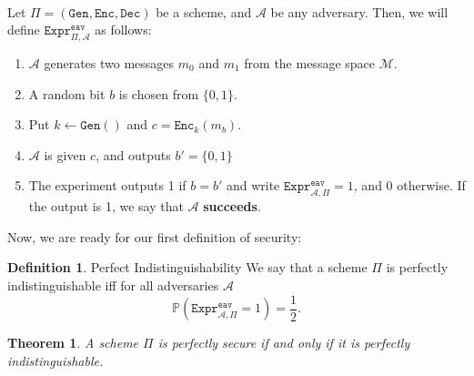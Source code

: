\documentclass{article}
\newtheorem{theorem}{Theorem}[section]
\theoremstyle{definition}
\newtheorem{definition}{Definition}[section]
\newcommand{\Enc}{\texttt{Enc}}
\newcommand{\Dec}{\texttt{Dec}}
\newcommand{\Gen}{\texttt{Gen}}
\newcommand{\M}{\mathcal{M}}
\newcommand{\A}{\mathcal{A}}
\newcommand{\Prob}{\mathbb{P}}
\newcommand{\Expr}[2]{\texttt{Expr}^{\texttt{#1}}_{#2}}
\begin{document}
\paragraph{}
Let $\Pi = (\Gen, \Enc, \Dec)$ be a scheme, and $\A$ be any adversary.
Then, we will define $\texttt{Expr}^{\texttt{eav}}_{\Pi, \A}$ as
follows:
\begin{enumerate}
\item $\A$ generates two messages $m_0$ and $m_1$ from the message space $\M$.
\item A random bit $b$ is chosen from $\{0, 1\}$.
\item Put $k \leftarrow \Gen()$ and $c = \Enc_k(m_b)$.
\item $\A$ is given $c$, and outputs $b'= \{0, 1\}$
\item The experiment outputs 1 if $b = b'$ and write $\Expr{eav}{\A, \Pi} = 1$,
  and 0 otherwise. If the output is 1, we say that $\A$ \textbf{succeeds}.
\end{enumerate}
Now, we are ready for our first definition of security:
\begin{definition}{Perfect Indistinguishability}
  \label{def:perfect_indistinguishability}
We say that a scheme $\Pi$ is perfectly indistinguishable iff for all adversaries $\A$
\[
  \Prob(\Expr{eav}{\A, \Pi} = 1) = \frac12.
\]
\end{definition}
\begin{theorem}
  \label{thm:perfect_equivalence}
A scheme $\Pi$ is perfectly secure if and only if it is perfectly indistinguishable.
\end{theorem}
\end{document}

